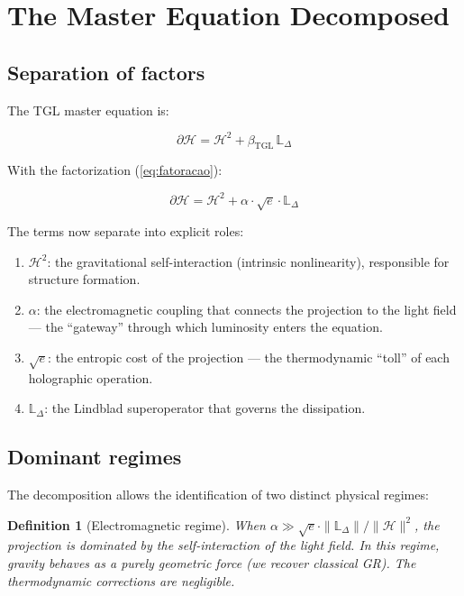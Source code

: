 \documentclass[12pt,a4paper,twoside]{article}
\newtheorem{definition}[theorem]{Definition}
\newcommand{\betatgl}{\beta_{\!\scriptscriptstyle\mathrm{TGL}}}
\begin{document}
\section{The Master Equation Decomposed}
\label{sec:mestra}

\subsection{Separation of factors}

The TGL master equation \cite{Miguel2026Fronteira} is:

\begin{equation}
\partial\mathcal{H} = \mathcal{H}^2 + \betatgl\,\mathbb{L}_\Delta
\end{equation}

With the factorization (\ref{eq:fatoracao}):

\begin{equationbox}[title={Factored Master Equation}]
\begin{equation}
\boxed{\partial\mathcal{H} = \mathcal{H}^2 + \alpha \cdot \sqrt{e} \cdot \mathbb{L}_\Delta}
\label{eq:mestra_fatorada}
\end{equation}
\end{equationbox}

The terms now separate into explicit roles:

\begin{enumerate}[nosep]
\item $\mathcal{H}^2$: the gravitational self-interaction (intrinsic nonlinearity), responsible for structure formation.
\item $\alpha$: the electromagnetic coupling that connects the projection to the light field --- the ``gateway'' through which luminosity enters the equation.
\item $\sqrt{e}$: the entropic cost of the projection --- the thermodynamic ``toll'' of each holographic operation.
\item $\mathbb{L}_\Delta$: the Lindblad superoperator that governs the dissipation.
\end{enumerate}

\subsection{Dominant regimes}

The decomposition allows the identification of two distinct physical regimes:

\begin{definition}[Electromagnetic regime]
When $\alpha \gg \sqrt{e} \cdot \|\mathbb{L}_\Delta\|/\|\mathcal{H}\|^2$, the projection is dominated by the self-interaction of the light field. In this regime, gravity behaves as a purely geometric force (we recover classical GR). The thermodynamic corrections are negligible.
\end{definition}
\end{document}
